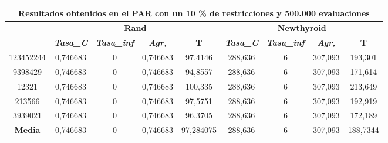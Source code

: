 \documentclass[12pt, spanish]{article}
\begin{document}
\begin{table}[H]
\begin{tabular}{|c|c|c|c|c|c|c|c|c|}
\hline
\multicolumn{9}{|c|}{\textbf{Resultados obtenidos en el PAR con un 10 \% de restricciones y 500.000 evaluaciones}}                                                                                                \\ \hline
\multirow{2}{*}{} & \multicolumn{4}{c|}{\textbf{Rand}}                                                            & \multicolumn{4}{c|}{\textbf{Newthyroid}}                                                      \\ \cline{2-9} 
                  & \textit{\textbf{Tasa\_C}} & \textit{\textbf{Tasa\_inf}} & \textit{\textbf{Agr,}} & \textbf{T} & \textit{\textbf{Tasa\_C}} & \textit{\textbf{Tasa\_inf}} & \textit{\textbf{Agr,}} & \textbf{T} \\ \hline
123452244         & 0,746683                  & 0                           & 0,746683               & 97,4146    & 288,636                   & 6                           & 307,093                & 193,301    \\ \hline
9398429           & 0,746683                  & 0                           & 0,746683               & 94,8557    & 288,636                   & 6                           & 307,093                & 171,614    \\ \hline
12321             & 0,746683                  & 0                           & 0,746683               & 100,335    & 288,636                   & 6                           & 307,093                & 213,649    \\ \hline
213566            & 0,746683                  & 0                           & 0,746683               & 97,5751    & 288,636                   & 6                           & 307,093                & 192,919    \\ \hline
3939021           & 0,746683                  & 0                           & 0,746683               & 96,3705    & 288,636                   & 6                           & 307,093                & 172,189    \\ \hline
\textbf{Media}    & 0,746683                  & 0                           & 0,746683               & 97,284075  & 288,636                   & 6                           & 307,093                & 188,7344   \\ \hline
\end{tabular}
\end{table}
\end{document}
